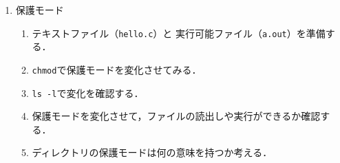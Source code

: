 \begin{enumerate}
\item 保護モード
\begin{enumerate}
\item テキストファイル（\texttt{hello.c}）と
実行可能ファイル（\texttt{a.out}）を準備する．
\item \texttt{chmod}で保護モードを変化させてみる．
\item \texttt{ls -l}で変化を確認する．
\item 保護モードを変化させて，ファイルの読出しや実行ができるか確認する．
\item ディレクトリの保護モードは何の意味を持つか考える．
\end{enumerate}
\end{enumerate}
